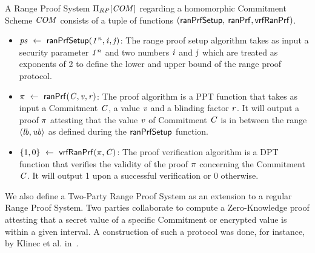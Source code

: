 \begin{definition}\label{def:pre:rangeproof}
    A Range Proof System $\Pi_{RP}[\mathit{COM}]$ regarding a homomorphic Commitment Scheme $\mathit{COM}$ consists of a tuple of functions $(\mathsf{ranPrfSetup},$ $\mathsf{ranPrf}, \mathsf{vrfRanPrf})$.
    \begin{itemize}
        \item $\mathit{ps} ~\leftarrow~ \mathsf{ranPrfSetup}(\mathit{1^n},\mathit{i},\mathit{j})$: The range proof setup algorithm takes as input a security parameter $\mathit{1^n}$ and two numbers $\mathit{i}$ and $\mathit{j}$ which are treated as exponents of 2  to define the lower and upper bound of the range proof protocol.
        \item $\pi ~\leftarrow~ \mathsf{ranPrf}(\mathit{C},\mathit{v},\mathit{r})$: The proof algorithm is a PPT function that takes as input a Commitment $\mathit{C}$, a value $\mathit{v}$ and a blinding factor $\mathit{r}$.
        It will output a proof $\pi$ attesting that the value $\mathit{v}$ of Commitment $\mathit{C}$ is in between the range $\langle \mathit{lb}, \mathit{ub} \rangle$  as defined during the $\mathsf{ranPrfSetup}$ function.
        \item $\{1,0\} ~\leftarrow~ \mathsf{vrfRanPrf}(\pi,\mathit{C})$: The proof verification algorithm is a DPT function that verifies the validity of the proof $\pi$ concerning the Commitment $\mathit{C}$.
        It will output 1 upon a successful verification or 0 otherwise.
    \end{itemize}
\end{definition}


We also define a Two-Party Range Proof System as an extension to a regular Range Proof System. Two parties collaborate to compute a Zero-Knowledge proof attesting that a secret value of a specific Commitment or encrypted value is within a given interval.
A construction of such a protocol was done, for instance, by Klinec et al. in~\cite{klinec2020privacy}.

